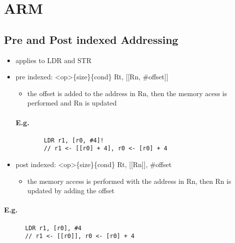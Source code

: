 \section{ARM}
  \subsection{Pre and Post indexed Addressing}
    \begin{itemize}
      \item applies to LDR and STR
      \item pre indexed: \textless op\textgreater \{size\}\{cond\} Rt, [[Rn,
      \#offset]]
      \begin{itemize}
        \item the offset is added to the address in Rn, then the memory acess
        is performed and Rn is updated
      \end{itemize}

      \paragraph{E.g.}
      \begin{lstlisting}
        LDR r1, [r0, #4]!
        // r1 <- [[r0] + 4], r0 <- [r0] + 4
      \end{lstlisting}

      \item post indexed: \textless op\textgreater \{size\}\{cond\} Rt, [[Rn]],
      \#offset
      \begin{itemize}
        \item the memory access is performed with the address in Rn, then Rn is
        updated by adding the offset
      \end{itemize}
    \end{itemize}

    \paragraph{E.g.}
    \begin{lstlisting}
      LDR r1, [r0], #4
      // r1 <- [[r0]], r0 <- [r0] + 4
    \end{lstlisting}

